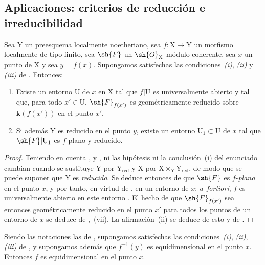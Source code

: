 \subsection{Aplicaciones: criterios de reducción e irreducibilidad}
\label{subsection:IV.15.3}

\begin{proposition}[15.3.1]
\label{IV.15.3.1}
Sea $\mathrm{Y}$ un preesquema localmente noetheriano, sea $f:\mathrm{X}\to\mathrm{Y}$ un morfismo localmente de tipo finito, sea $\sh{F}$ un $\sh{O}_\mathrm{X}$-módulo coherente, sea $x$ un punto de $\mathrm{X}$ y sea $y=f(x)$.
Supongamos satisfechas las condiciones~\emph{(i)}, \emph{(ii)} y \emph{(iii)} de .
Entonces:
\begin{enumerate}[label=\textup{(\roman*)}]
  \item Existe un entorno $\mathrm{U}$ de $x$ en $\mathrm{X}$ tal que $f|\mathrm{U}$ es universalmente abierto y tal que, para todo $x'\in\mathrm{U}$, $\sh{F}_{f(x')}$ es geométricamente reducido sobre $\boldsymbol{k}(f(x'))$ en el punto $x'$.
  \item Si además $\mathrm{Y}$ es reducido en el punto $y$, existe un entorno $\mathrm{U}_1\subset\mathrm{U}$ de $x$ tal que $\sh{F}|\mathrm{U}_1$ es $f$-plano y reducido.
\end{enumerate}
\end{proposition}

\begin{proof}
\label{IV.15.3.1-proof}
Teniendo en cuenta ,  y , ni las hipótesis ni la conclusión~(i) del enunciado cambian cuando se sustituye $\mathrm{Y}$ por $\mathrm{Y}_\mathrm{red}$ y $\mathrm{X}$ por $\mathrm{X}\times_\mathrm{Y}\mathrm{Y}_\mathrm{red}$, de modo que se puede suponer que $\mathrm{Y}$ es \emph{reducido}.
Se deduce entonces de  que $\sh{F}$ es $f$-\emph{plano} en el punto $x$, y por tanto, en virtud de , en un entorno de $x$; \emph{a~fortiori}, $f$ es universalmente abierto en este entorno .
El hecho de que $\sh{F}_{f(x')}$ sea entonces geométricamente reducido en el punto $x'$
para todos los puntos de un entorno de $x$ se deduce de ,~(vii).
La afirmación~(ii) se deduce de esto y de .
\end{proof}

\begin{proposition}[15.3.2]
\label{IV.15.3.2}
Siendo las notaciones las de , supongamos satisfechas las condiciones~\emph{(i)}, \emph{(ii)}, \emph{(iii)} de , y supongamos además que $f^{-1}(y)$ es equidimensional en el punto $x$.
Entonces $f$ es equidimensional en el punto $x$.
\end{proposition}

